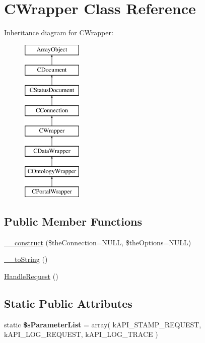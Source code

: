 \hypertarget{class_c_wrapper}{\section{C\-Wrapper Class Reference}
\label{class_c_wrapper}
}
Inheritance diagram for C\-Wrapper\-:\begin{figure}[H]
\begin{center}
\leavevmode
\includegraphics[height=8.000000cm]{class_c_wrapper}
\end{center}
\end{figure}
\subsection*{Public Member Functions}
\begin{DoxyCompactItemize}
\item 
\hyperlink{class_c_wrapper_ab5f77aac3044e183886395ad553fa13a}{\-\_\-\-\_\-construct} (\$the\-Connection=N\-U\-L\-L, \$the\-Options=N\-U\-L\-L)
\item 
\hyperlink{class_c_wrapper_ac9ca75e8d8d1f965218bece1ef55c003}{\-\_\-\-\_\-to\-String} ()
\item 
\hyperlink{class_c_wrapper_a0e605ca2cdd718ecdeb6f3be9b1f0162}{Handle\-Request} ()
\end{DoxyCompactItemize}
\subsection*{Static Public Attributes}
\begin{DoxyCompactItemize}
\item 
\hypertarget{class_c_wrapper_af2a7faae3b12ef8feb3dc840bf61e149}{static {\bfseries \$s\-Parameter\-List} = array( k\-A\-P\-I\-\_\-\-S\-T\-A\-M\-P\-\_\-\-R\-E\-Q\-U\-E\-S\-T, k\-A\-P\-I\-\_\-\-L\-O\-G\-\_\-\-R\-E\-Q\-U\-E\-S\-T, k\-A\-P\-I\-\_\-\-L\-O\-G\-\_\-\-T\-R\-A\-C\-E )}\label{class_c_wrapper_af2a7faae3b12ef8feb3dc840bf61e149}

\end{DoxyCompactItemize}
